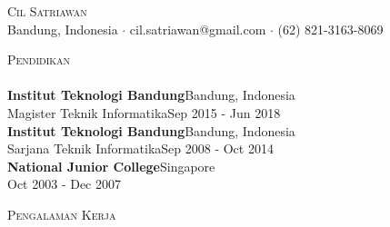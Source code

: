 \documentclass[a4paper]{article}
\newcommand{\lineunder} {
    \vspace*{-8pt} \\
    \hspace*{-18pt} \hrulefill \\
}
\newcommand{\header} [1] {
    {\hspace*{-18pt}\vspace*{6pt} \textsc{#1}}
    \vspace*{-6pt} \lineunder
}
\begin{document}
\vspace*{-40pt}

    

\vspace*{-10pt}
\begin{center}
	{\Huge \scshape {Cil Satriawan}}\\
	Bandung, Indonesia $\cdot$ cil.satriawan@gmail.com $\cdot$ (62) 821-3163-8069\\
\end{center}

\header{Pendidikan}
\vspace{1mm}
\textbf{Institut Teknologi Bandung}\hfill Bandung, Indonesia\\
Magister Teknik Informatika\hfill Sep 2015 - Jun 2018\\
\vspace{5mm}
\textbf{Institut Teknologi Bandung}\hfill Bandung, Indonesia\\
Sarjana Teknik Informatika\hfill Sep 2008 - Oct 2014\\
\vspace{5mm}
\textbf{National Junior College}\hfill Singapore\\
 \hfill Oct 2003 - Dec 2007\\
\vspace{5mm}

\header{Pengalaman Kerja}
\vspace{1mm}
\end{document}
